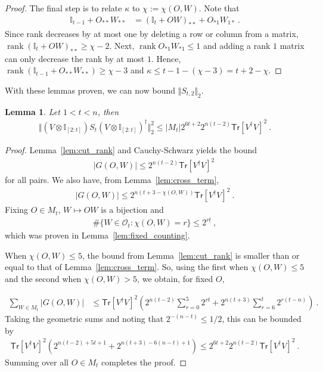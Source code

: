 \documentclass[11pt]{article}
\newtheorem{lemma}[theorem]{Lemma}
\newcommand{\id}{\ensuremath{\mathbb{I}}}
\newcommand{\Tr}{\mathsf{Tr}}
\newcommand{\Oc}{\mathcal{O}}
\DeclareMathOperator{\rank}{rank}
\begin{document}
\begin{proof}
    The final step is to relate $\kappa$ to $\chi := \chi(O,W)$. Note that
    \begin{align}
        \id_{t-1}+O_{**}W_{**} & = (\id_t + OW)_{**} + O_{*1}W_{1*}\ .
    \end{align}
    Since rank decreases by at most one by deleting a row or column from a matrix, $\rank (\id_t + OW)_{**} \geq \chi - 2$. Next, $\rank O_{*1}W_{*1} \leq 1$ and adding a rank $1$ matrix can only decrease the rank by at most $1$. Hence, $\rank (\id_{t-1}+O_{**}W_{**}) \geq \chi - 3$ and $\kappa \leq t-1-(\chi-3) = t+2-\chi$.
\end{proof}

With these lemmas proven, we can now bound $\Vert S_{t,2}\Vert_2$.

\begin{lemma}\label{lem:2_norm_bound}
Let $1<t < n$, then
    \begin{align}
        \Vert (V\otimes \id_{[2:t]})S_t(V\otimes \id_{[2:t]})^\dagger \Vert_2^2 \leq \vert M_t\vert 2^{6t+2} 2^{n(t-2)}\Tr[V^\dagger V]^2\ .
    \end{align}
\end{lemma}
\begin{proof}
    Lemma~\ref{lem:cut_rank} and Cauchy-Schwarz yields the bound
    \begin{align}
        \vert G(O,W)\vert \leq 2^{n(t-2)}\Tr[V^\dagger V]^2\ 
    \end{align}
    for all pairs. We also have, from Lemma~\ref{lem:cross_term},
    \begin{align}
        \vert G(O,W)\vert \leq 2^{n(t+3-\chi(O,W))}\Tr[V^\dagger V]^2\ .
    \end{align}
    Fixing $O \in M_t$, $W\mapsto OW$ is a bijection and 
    \begin{align}
        \#\{W\in \Oc_t : \chi(O,W) = r\} \leq 2^{rt}\ ,
    \end{align}
    which was proven in Lemma~\ref{lem:fixed_counting}.
    

    When $\chi(O,W) \leq 5$, the bound from Lemma~\ref{lem:cut_rank} is smaller than or equal to that of Lemma~\ref{lem:cross_term}. So, using the first when $\chi(O,W) \leq 5$ and the second when $\chi(O,W) > 5$, we obtain, for fixed $O$,

    \begin{align}
        \sum_{W \in M_t} \vert G(O,W)\vert & \leq \Tr[V^\dagger V]^2\left(2^{n(t-2)}\sum_{r=0}^5 2^{rt} + 2^{n(t+3)}\sum_{r=6}^t 2^{r(t-n)} \right)\ .
    \end{align}
    Taking the geometric sums and noting that $2^{-(n-t)} \leq 1/2$, this can be bounded by
    \begin{align}
        \Tr[V^\dagger V]^2 \left( 2^{n(t-2)+5t+1} + 2^{n(t+3)-6(n-t)+1}\right) \leq 2^{6t+2}2^{n(t-2)}\Tr[V^\dagger V]^2\ .
    \end{align}
    Summing over all $O \in M_t$ completes the proof.
\end{proof}
\end{document}
